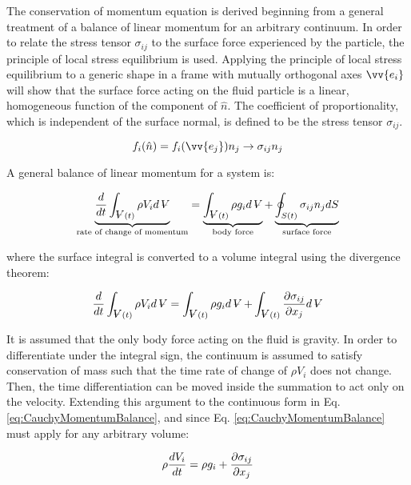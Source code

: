 \documentclass[10pt]{article}
\newcounter{subsubsubsection}[subsubsection]
\newcommand{\volume}{\mathop{\ooalign{\hfil$V$\hfil\cr\kern0.08em--\hfil\cr}}\nolimits}
\numberwithin{equation}{section} %
\begin{document}
\label{sec:NS}

The conservation of momentum equation is derived beginning from a general treatment of a balance of linear momentum for an arbitrary continuum. In order to relate the stress tensor \(\sigma_{ij}\) to the surface force experienced by the particle, the principle of local stress equilibrium is used. Applying the principle of local stress equilibrium to a generic shape in a frame with mutually orthogonal axes \(\vv{e_i}\) will show that the surface force acting on the fluid particle is a linear, homogeneous function of the component of \(\hat{n}\). The coefficient of proportionality, which is independent of the surface normal, is defined to be the stress tensor \(\sigma_{ij}\). 

\begin{equation}
\label{eq:StressTensorDefinition}
f_i(\hat{n})=f_i(\vv{e_j})n_j\rightarrow\sigma_{ij}n_j
\end{equation}

A general balance of linear momentum for a system is:

\begin{equation}
\underbrace{\frac{d}{dt}\int_{\volume(t)}^{}\rho V_id\volume}_{\text{rate of change of momentum}}=\underbrace{\int_{\volume(t)}^{}\rho g_id\volume}_{\text{body force}}+\underbrace{\oint_{S(t)}^{}\sigma_{ij}n_jdS}_{\text{surface force}}
\end{equation}

where the surface integral is converted to a volume integral using the divergence theorem:

\begin{equation}
\label{eq:CauchyMomentumBalance}
\frac{d}{dt}\int_{\volume(t)}^{}\rho V_id\volume=\int_{\volume(t)}^{}\rho g_id\volume+\int_{\volume(t)}^{}\frac{\partial\sigma_{ij}}{\partial x_j}d\volume
\end{equation}

It is assumed that the only body force acting on the fluid is gravity. In order to differentiate under the integral sign, the continuum is assumed to satisfy conservation of mass such that the time rate of change of \(\rho V_i\) does not change. Then, the time differentiation can be moved inside the summation to act only on the velocity. Extending this argument to the continuous form in Eq. \eqref{eq:CauchyMomentumBalance}, and since Eq. \eqref{eq:CauchyMomentumBalance} must apply for any arbitrary volume:

\begin{equation}
\label{eq:CauchyMomentum}
\rho\frac{dV_i}{dt}=\rho g_i+\frac{\partial\sigma_{ij}}{\partial x_j}\\
\end{equation}
\end{document}
